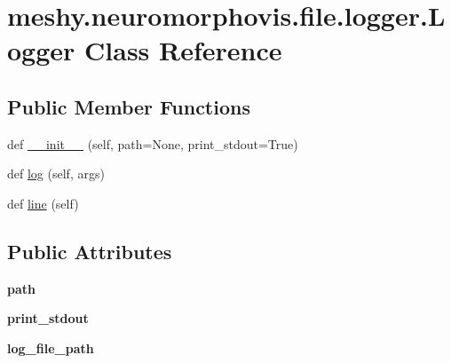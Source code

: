 \hypertarget{classmeshy_1_1neuromorphovis_1_1file_1_1logger_1_1Logger}{}\section{meshy.\+neuromorphovis.\+file.\+logger.\+Logger Class Reference}
\label{classmeshy_1_1neuromorphovis_1_1file_1_1logger_1_1Logger}


 


\subsection*{Public Member Functions}
\begin{DoxyCompactItemize}
\item 
def \hyperlink{classmeshy_1_1neuromorphovis_1_1file_1_1logger_1_1Logger_a68694fd8a31188c92d04e2ee083632a7}{\+\_\+\+\_\+init\+\_\+\+\_\+} (self, path=None, print\+\_\+stdout=True)
\item 
def \hyperlink{classmeshy_1_1neuromorphovis_1_1file_1_1logger_1_1Logger_a653a0dcd91ca996ef49e8b287cdcd68b}{log} (self, args)
\item 
def \hyperlink{classmeshy_1_1neuromorphovis_1_1file_1_1logger_1_1Logger_a91116831602cfd5f5116ead12cbb243f}{line} (self)
\end{DoxyCompactItemize}
\subsection*{Public Attributes}
\begin{DoxyCompactItemize}
\item 
{\bfseries path}\hypertarget{classmeshy_1_1neuromorphovis_1_1file_1_1logger_1_1Logger_ab510baad5d9a123b6f72d2cd723cf566}{}\label{classmeshy_1_1neuromorphovis_1_1file_1_1logger_1_1Logger_ab510baad5d9a123b6f72d2cd723cf566}

\item 
{\bfseries print\+\_\+stdout}\hypertarget{classmeshy_1_1neuromorphovis_1_1file_1_1logger_1_1Logger_ae6e7789be0004ed2d9637f908d5fc162}{}\label{classmeshy_1_1neuromorphovis_1_1file_1_1logger_1_1Logger_ae6e7789be0004ed2d9637f908d5fc162}

\item 
{\bfseries log\+\_\+file\+\_\+path}\hypertarget{classmeshy_1_1neuromorphovis_1_1file_1_1logger_1_1Logger_a6583f1a7bf0a65dbb4b904f2d5e1eb4a}{}\label{classmeshy_1_1neuromorphovis_1_1file_1_1logger_1_1Logger_a6583f1a7bf0a65dbb4b904f2d5e1eb4a}

\end{DoxyCompactItemize}


